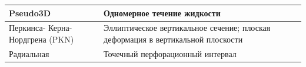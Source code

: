 \begin{longtable}[l]{|L{2.8cm}|L{6.7cm}|L{6.2cm}|}
	Pseudo3D&Одномерное течение жидкости&\hfill\break{}\\ \hline
	Перкинса- Керна- Нордгрена (PKN)&Эллиптическое вертикальное сечение; плоская деформация в вертикальной плоскости&\hfill\break{}\\ \hline
	Радиальная&Точечный перфорационный интервал&\hfill\break{}\\ \hline

\end{longtable}
